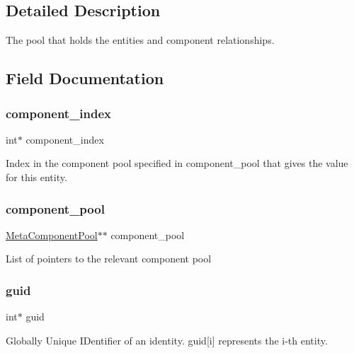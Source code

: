 \subsection{Detailed Description}
The pool that holds the entities and component relationships. 

\subsection{Field Documentation}
\mbox{\label{struct_entity_pool_ac5c84e33e66445aa6755a43a7b70ca72}} 
\subsubsection{\texorpdfstring{component\+\_\+index}{component\_index}}
{\footnotesize\ttfamily int$\ast$ component\+\_\+index}

Index in the component pool specified in {\ttfamily component\+\_\+pool} that gives the value for this entity. \mbox{\label{struct_entity_pool_ad75884ed3133e339a80f0eb00e0bd974}} 
\subsubsection{\texorpdfstring{component\+\_\+pool}{component\_pool}}
{\footnotesize\ttfamily \mbox{\hyperlink{struct_meta_component_pool}{Meta\+Component\+Pool}}$\ast$$\ast$ component\+\_\+pool}

List of pointers to the relevant component pool \mbox{\label{struct_entity_pool_a662c49cdd0bdc65d6ce8380c45290bca}} 
\subsubsection{\texorpdfstring{guid}{guid}}
{\footnotesize\ttfamily int$\ast$ guid}

Globally Unique I\+Dentifier of an identity. {\ttfamily guid\mbox{[}i\mbox{]}} represents the i-\/th entity. \mbox{\label{struct_entity_pool_aefadcdd88d2e6364fd584f35c374d324}} 

